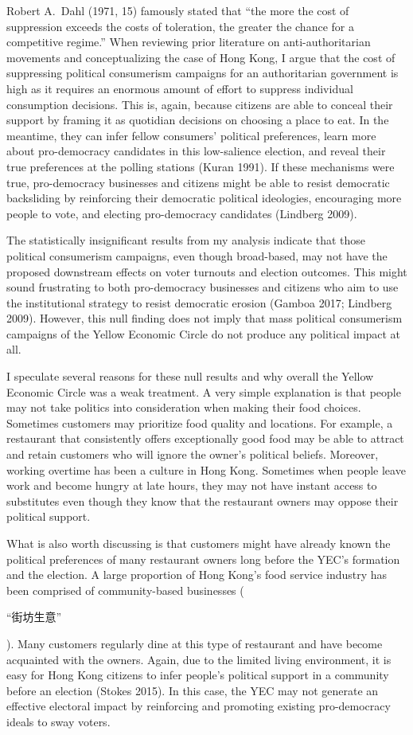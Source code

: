 \documentclass[letterpaper, 12pt]{article}
\begin{document}
Robert A.\ Dahl (1971, 15) famously stated that ``the more the cost of suppression exceeds the costs of toleration, the greater the chance for a competitive regime.'' When reviewing prior literature on anti-authoritarian movements and conceptualizing the case of Hong Kong, I argue that the cost of suppressing political consumerism campaigns for an authoritarian government is high as it requires an enormous amount of effort to suppress individual consumption decisions. This is, again, because citizens are able to conceal their support by framing it as quotidian decisions on choosing a place to eat. In the meantime, they can infer fellow consumers' political preferences, learn more about pro-democracy candidates in this low-salience election, and reveal their true preferences at the polling stations (Kuran 1991). If these mechanisms were true, pro-democracy businesses and citizens might be able to resist democratic backsliding by reinforcing their democratic political ideologies, encouraging more people to vote, and electing pro-democracy candidates (Lindberg 2009).

The statistically insignificant results from my analysis indicate that those political consumerism campaigns, even though broad-based, may not have the proposed downstream effects on voter turnouts and election outcomes. This might sound frustrating to both pro-democracy businesses and citizens who aim to use the institutional strategy to resist democratic erosion (Gamboa 2017; Lindberg 2009). However, this null finding does not imply that mass political consumerism campaigns of the Yellow Economic Circle do not produce any political impact at all.

I speculate several reasons for these null results and why overall the Yellow Economic Circle was a weak treatment. A very simple explanation is that people may not take politics into consideration when making their food choices. Sometimes customers may prioritize food quality and locations. For example, a restaurant that consistently offers exceptionally good food may be able to attract and retain customers who will ignore the owner's political beliefs. Moreover, working overtime has been a culture in Hong Kong. Sometimes when people leave work and become hungry at late hours, they may not have instant access to substitutes even though they know that the restaurant owners may oppose their political support. 
    
What is also worth discussing is that customers might have already known the political preferences of many restaurant owners long before the YEC's formation and the election. A large proportion of Hong Kong's food service industry has been comprised of community-based businesses (\begin{CJK*}{UTF8}{bkai}``街坊生意''\end{CJK*}). Many customers regularly dine at this type of restaurant and have become acquainted with the owners. Again, due to the limited living environment, it is easy for Hong Kong citizens to infer people's political support in a community before an election (Stokes 2015). In this case, the YEC may not generate an effective electoral impact by reinforcing and promoting existing pro-democracy ideals to sway voters.
\end{document}
